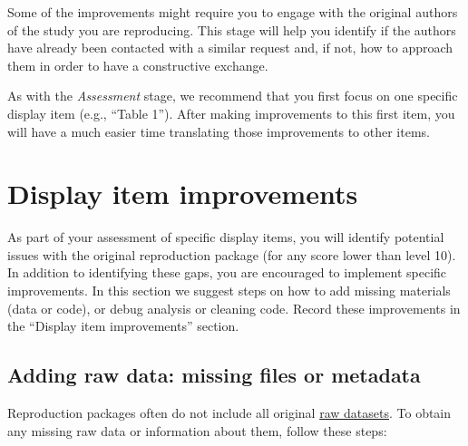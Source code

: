 \documentclass[
]{book}
\begin{document}
Some of the improvements might require you to engage with the original authors of the study you are reproducing. This stage will help you identify if the authors have already been contacted with a similar request and, if not, how to approach them in order to have a constructive exchange.

As with the \emph{Assessment} stage, we recommend that you first focus on one specific display item (e.g., ``Table 1''). After making improvements to this first item, you will have a much easier time translating those improvements to other items.

\hypertarget{di-imp}{%
\section{Display item improvements}\label{di-imp}}

As part of your assessment of specific display items, you will identify potential issues with the original reproduction package (for any score lower than level 10). In addition to identifying these gaps, you are encouraged to implement specific improvements. In this section we suggest steps on how to add missing materials (data or code), or debug analysis or cleaning code. Record these improvements in the ``Display item improvements'' section.

\hypertarget{rd}{%
\subsection{Adding raw data: missing files or metadata}\label{rd}}

Reproduction packages often do not include all original \protect\hyperlink{describe-inputs}{raw datasets}. To obtain any missing raw data or information about them, follow these steps:
\end{document}
